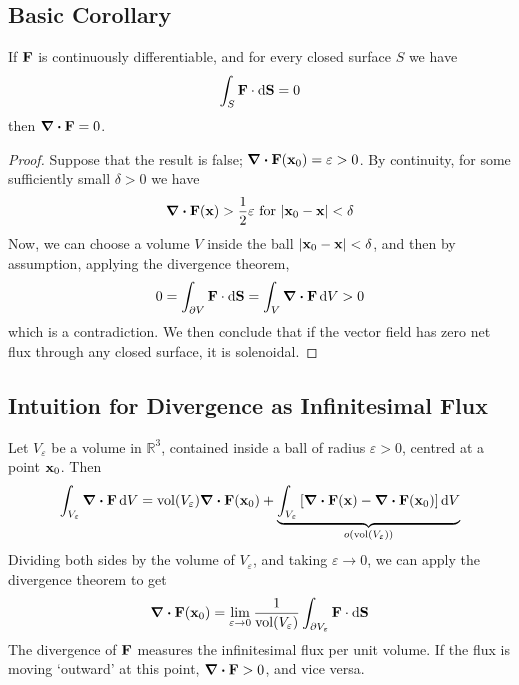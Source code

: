 \subsection{Basic Corollary}
\begin{proposition}
	If \(\vb F\) is continuously differentiable, and for every closed surface \(S\) we have
	\[ \int_S \vb F \cdot \dd{\vb S} = 0 \]
	then \(\div{\vb F} = 0\).
\end{proposition}
\begin{proof}
	Suppose that the result is false; \(\div{\vb F}(\vb x_0) = \varepsilon > 0\). By continuity, for some sufficiently small \(\delta > 0\) we have
	\[ \div{\vb F}(\vb x) > \frac{1}{2} \varepsilon \text{ for } \abs{\vb x_0 - \vb x} < \delta \]
	Now, we can choose a volume \(V\) inside the ball \(\abs{\vb x_0 - \vb x} < \delta\), and then by assumption, applying the divergence theorem,
	\[ 0 = \int_{\partial V} \vb F \cdot \dd{\vb S} = \int_V \div{\vb F} \dd{V} > 0 \]
	which is a contradiction. We then conclude that if the vector field has zero net flux through any closed surface, it is solenoidal.
\end{proof}

\subsection{Intuition for Divergence as Infinitesimal Flux}
Let \(V_\varepsilon\) be a volume in \(\mathbb R^3\), contained inside a ball of radius \(\varepsilon > 0\), centred at a point \(\vb x_0\). Then
\[ \int_{V_\varepsilon} \div{\vb F} \dd{V} = \mathrm{vol}(V_\varepsilon) \div{\vb F}(\vb x_0) + \underbrace{\int_{V_\varepsilon}  \left[ \div{\vb F}(\vb x) - \div{\vb F}(\vb x_0) \right] \dd{V}}_{o(\mathrm{vol}(V_\varepsilon))} \]
Dividing both sides by the volume of \(V_\varepsilon\), and taking \(\varepsilon \to 0\), we can apply the divergence theorem to get
\[ \div{\vb F}(\vb x_0) = \lim_{\varepsilon \to 0} \frac{1}{\mathrm{vol}(V_\varepsilon)} \int_{\partial V_\varepsilon} \vb F \cdot \dd{\vb S} \]
The divergence of \(\vb F\) measures the infinitesimal flux per unit volume. If the flux is moving `outward' at this point, \(\div{\vb F} > 0\), and vice versa.

